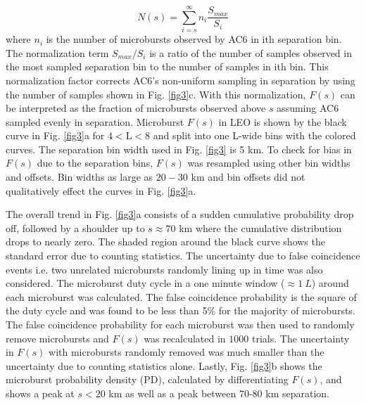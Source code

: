 \documentclass[draft]{agujournal2019}
\begin{document}
\begin{equation}
N(s) = \sum_{i = s}^\infty n_{i} \frac{S_{max}}{S_{i}}
\end{equation} where $n_{i}$ is the number of microbursts observed by AC6 in ith separation bin. The normalization term $S_{max}/S_{i}$ is a ratio of the number of samples observed in the most sampled separation bin to the number of samples in ith bin. This normalization factor corrects AC6's non-uniform sampling in separation by using the number of samples shown in Fig. \ref{fig3}c. With this normalization, $F(s)$ can be interpreted as the fraction of microbursts observed above $s$ assuming AC6 sampled evenly in separation. Microburst $F(s)$ in LEO is shown by the black curve in Fig. \ref{fig3}a for $4 < \mathrm{L}< 8$ and split into one L-wide bins with the colored curves. The separation bin width used in Fig. \ref{fig3} is 5 km. To check for bias in $F(s)$ due to the separation bins, $F(s)$ was resampled using other bin widths and offsets. Bin widths as large as $20-30$ km and bin offsets did not qualitatively effect the curves in Fig. \ref{fig3}a.

The overall trend in Fig. \ref{fig3}a consists of a sudden cumulative probability drop off, followed by a shoulder up to $s \approx 70$ km where the cumulative distribution drops to nearly zero. The shaded region around the black curve shows the standard error due to counting statistics. The uncertainty due to false coincidence events i.e. two unrelated microbursts randomly lining up in time was also considered. The microburst duty cycle in a one minute window ($\approx 1 \ L$) around each microburst was calculated. The false coincidence probability is the square of the duty cycle and was found to be less than 5\% for the majority of microbursts. The false coincidence probability for each microburst was then used to randomly remove microbursts and $F(s)$ was recalculated in $1000$ trials. The uncertainty in $F(s)$ with microbursts randomly removed was much smaller than the uncertainty due to counting statistics alone. Lastly, Fig. \ref{fig3}b shows the microburst probability density (PD), calculated by differentiating $F(s)$, and shows a peak at $s < 20 $ km as well as a peak between 70-80 km separation. 
\end{document}
